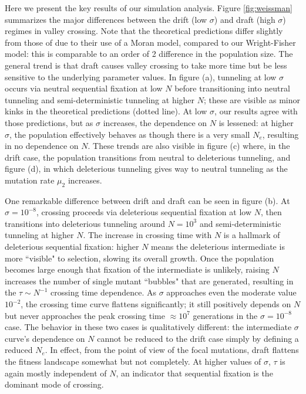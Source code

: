 \documentclass[10pt,twocolumn,twoside]{gsajnl}
\begin{document}
\begin{spacing}{1.5}
Here we present the key results of our simulation analysis.
Figure \ref{fig:weissman} summarizes the major differences between the drift (low $\sigma$) and draft (high $\sigma$) regimes in valley crossing.
Note that the theoretical predictions differ slightly from those of \citet{weissman_2009} due to their use of a Moran model, compared to our Wright-Fisher model: this is comparable to an order of 2 difference in the population size.
The general trend is that draft causes valley crossing to take more time but be less sensitive to the underlying parameter values.
In figure (a), tunneling at low $\sigma$ occurs via neutral sequential fixation at low $N$ before transitioning into neutral tunneling and semi-deterministic tunneling at higher $N$; these are visible as minor kinks in the theoretical predictions (dotted line).
At low $\sigma$, our results agree with those predictions, but as $\sigma$ increases, the dependence on $N$ is lessened: at higher $\sigma$, the population effectively behaves as though there is a very small $N_e$, resulting in no dependence on $N$.
These trends are also visible in figure (c) where, in the drift case, the population transitions from neutral to deleterious tunneling, and figure (d), in which deleterious tunneling gives way to neutral tunneling as the mutation rate $\mu_2$ increases.

One remarkable difference between drift and draft can be seen in figure (b).
At $\sigma = 10^{-8}$, crossing proceeds via deleterious sequential fixation at low $N$, then transitions into deleterious tunneling around $N = 10^3$ and semi-deterministic tunneling at higher $N$.
The increase in crossing time with $N$ is a hallmark of deleterious sequential fixation: higher $N$ means the deleterious intermediate is more ``visible" to selection, slowing its overall growth.
Once the population becomes large enough that fixation of the intermediate is unlikely, raising $N$ increases the number of single mutant ``bubbles" that are generated, resulting in the $\tau \sim N^{-1}$ crossing time dependence.
As $\sigma$ approaches even the moderate value $10^{-2}$, the crossing time curve flattens significantly; it still positively depends on $N$ but never approaches the peak crossing time $\approx 10^7$ generations in the $\sigma = 10^{-8}$ case.
The behavior in these two cases is qualitatively different: the intermediate $\sigma$ curve's dependence on $N$ cannot be reduced to the drift case simply by defining a reduced $N_e$.
In effect, from the point of view of the focal mutations, draft flattens the fitness landscape somewhat but not completely.
At higher values of $\sigma$, $\tau$ is again mostly independent of $N$, an indicator that sequential fixation is the dominant mode of crossing.


\end{spacing}
\end{document}
